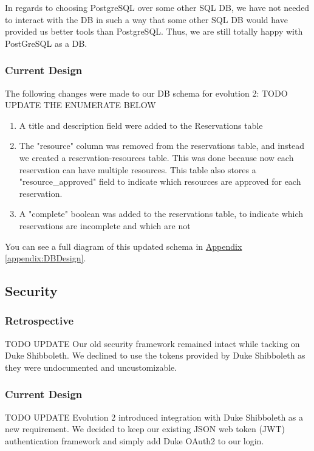 \documentclass[12pt]{article}
\begin{document}
In regards to choosing PostgreSQL over some other SQL DB, we have not needed to interact with the DB in such a way that some other SQL DB would have provided us better tools than PostgreSQL. Thus, we are still totally happy with PostGreSQL as a DB. 

\subsubsection{Current Design}
The following changes were made to our DB schema for evolution 2:
{\huge TODO UPDATE THE ENUMERATE BELOW}
\begin{enumerate}
    \item A title and description field were added to the Reservations table
    \item The "resource" column was removed from the reservations table, and instead we created a reservation-resources table. This was done because now each reservation can have multiple resources. This table also stores a "resource_approved" field to indicate which resources are approved for each reservation. 
    \item A "complete" boolean was added to the reservations table, to indicate which reservations are incomplete and which are not
\end{enumerate}

You can see a full diagram of this updated schema in  \hyperref[appendix:DBDesign]{Appendix \ref{appendix:DBDesign}}. 

\subsection{Security}
\subsubsection{Retrospective}
{\huge TODO UPDATE}
Our old security framework remained intact while tacking on Duke Shibboleth. We declined to use the tokens provided by Duke Shibboleth as they were undocumented and uncustomizable. 

\subsubsection{Current Design}
{\huge TODO UPDATE}
Evolution 2 introduced integration with Duke Shibboleth as a new requirement. We decided to keep our existing JSON web token (JWT) authentication framework and simply add Duke OAuth2 to our login. 
\end{document}
